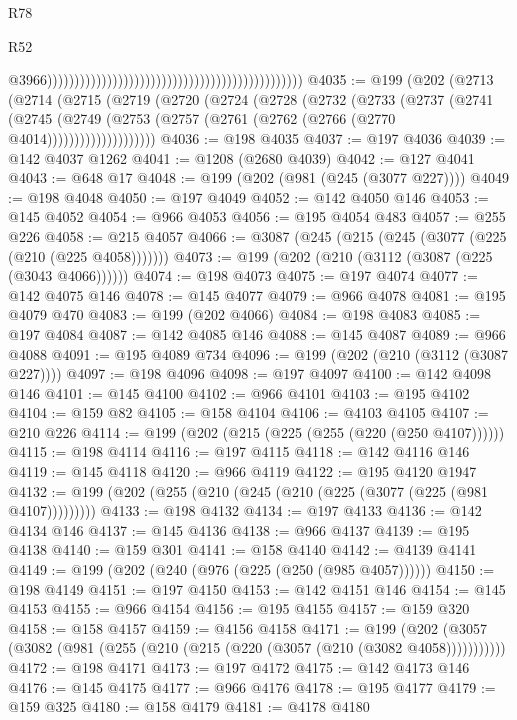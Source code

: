 \begin{lexlean}{R78}
\begin{lexlean}{R52}
\begin{coremodule}
{{{{{{{{{{{{{{{{{{{{{{{{{{{{{{{{{{{{{{{{{{{{{{{{{{{{{{{{{{{{{{{{{{{{{{{{{{{{{{{{{{{{{{{{{{{{{{{{{{{{{{{{{{{{{{{{{{{{{{{{{{{{{{{{{{{{{{{{{{{{{{{{{{{{{{{{{{{{{{{{{{{{{{{{{{{{{{{{{{{{{{{{{{{{{{{{{{{{{{                                                                                                  @3966)))))))))))))))))))))))))))))))))))))))))))))))
@4035 := @199
    (@202
      (@2713
        (@2714
          (@2715
            (@2719
              (@2720
                (@2724
                  (@2728
                    (@2732
                      (@2733
                        (@2737
                          (@2741
                            (@2745
                              (@2749
                                (@2753 (@2757 (@2761 (@2762 (@2766 (@2770 @4014))))))))))))))))))))
@4036 := @198 @4035
@4037 := @197 @4036
@4039 := @142 @4037 @1262
@4041 := @1208 (@2680 @4039)
@4042 := @127 @4041
@4043 := @648 @17
@4048 := @199 (@202 (@981 (@245 (@3077 @227))))
@4049 := @198 @4048
@4050 := @197 @4049
@4052 := @142 @4050 @146
@4053 := @145 @4052
@4054 := @966 @4053
@4056 := @195 @4054 @483
@4057 := @255 @226
@4058 := @215 @4057
@4066 := @3087 (@245 (@215 (@245 (@3077 (@225 (@210 (@225 @4058)))))))
@4073 := @199 (@202 (@210 (@3112 (@3087 (@225 (@3043 @4066))))))
@4074 := @198 @4073
@4075 := @197 @4074
@4077 := @142 @4075 @146
@4078 := @145 @4077
@4079 := @966 @4078
@4081 := @195 @4079 @470
@4083 := @199 (@202 @4066)
@4084 := @198 @4083
@4085 := @197 @4084
@4087 := @142 @4085 @146
@4088 := @145 @4087
@4089 := @966 @4088
@4091 := @195 @4089 @734
@4096 := @199 (@202 (@210 (@3112 (@3087 @227))))
@4097 := @198 @4096
@4098 := @197 @4097
@4100 := @142 @4098 @146
@4101 := @145 @4100
@4102 := @966 @4101
@4103 := @195 @4102
@4104 := @159 @82
@4105 := @158 @4104
@4106 := @4103 @4105
@4107 := @210 @226
@4114 := @199 (@202 (@215 (@225 (@255 (@220 (@250 @4107))))))
@4115 := @198 @4114
@4116 := @197 @4115
@4118 := @142 @4116 @146
@4119 := @145 @4118
@4120 := @966 @4119
@4122 := @195 @4120 @1947
@4132 := @199 (@202 (@255 (@210 (@245 (@210 (@225 (@3077 (@225 (@981 @4107)))))))))
@4133 := @198 @4132
@4134 := @197 @4133
@4136 := @142 @4134 @146
@4137 := @145 @4136
@4138 := @966 @4137
@4139 := @195 @4138
@4140 := @159 @301
@4141 := @158 @4140
@4142 := @4139 @4141
@4149 := @199 (@202 (@240 (@976 (@225 (@250 (@985 @4057))))))
@4150 := @198 @4149
@4151 := @197 @4150
@4153 := @142 @4151 @146
@4154 := @145 @4153
@4155 := @966 @4154
@4156 := @195 @4155
@4157 := @159 @320
@4158 := @158 @4157
@4159 := @4156 @4158
@4171 := @199 (@202 (@3057 (@3082 (@981 (@255 (@210 (@215 (@220 (@3057 (@210 (@3082 @4058)))))))))))
@4172 := @198 @4171
@4173 := @197 @4172
@4175 := @142 @4173 @146
@4176 := @145 @4175
@4177 := @966 @4176
@4178 := @195 @4177
@4179 := @159 @325
@4180 := @158 @4179
@4181 := @4178 @4180
}}}}}}}}}}}}}}}}}}}}}}}}}}}}}}}}}}}}}}}}}}}}}}}}}}}}}}}}}}}}}}}}}}}}}}}}}}}}}}}}}}}}}}}}}}}}}}}}}}}}}}}}}}}}}}}}}}}}}}}}}}}}}}}}}}}}}}}}}}}}}}}}}}}}}}}}}}}}}}}}}}}}}}}}}}}}}}}}}}}}}}}}}}}}}}}}}}}}}}
\end{coremodule}
\end{lexlean}
\end{lexlean}
